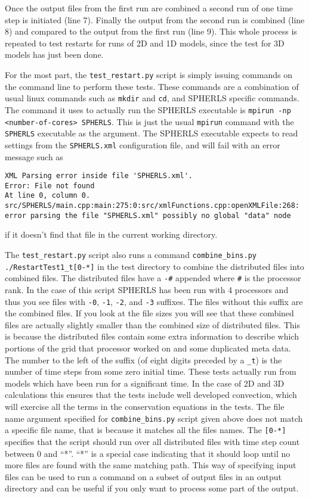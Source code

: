\documentclass[12pt,a4paper]{book}
\begin{document}
Once the output files from the first run are combined a second run of one time step is initiated (line 7). Finally the output from the second run is combined (line 8) and compared to the output from the first run (line 9). This whole process is repeated to test restarts for runs of 2D and 1D models, since the test for 3D models has just been done.

For the most part, the {\tt test\_restart.py} script is simply issuing commands on the command line to perform these tests. These commands are a combination of usual linux commands such as {\tt mkdir} and {\tt cd}, and SPHERLS specific commands. The command it uses to actually run the SPHERLS executable is {\tt mpirun -np <number-of-cores> SPHERLS}. This is just the usual {\tt mpirun} command with the {\tt SPHERLS} executable as the argument. The SPHERLS executable expects to read settings from the {\tt SPHERLS.xml} configuration file, and will fail with an error message such as 

{\tiny
\begin{verbatim}
XML Parsing error inside file 'SPHERLS.xml'.
Error: File not found
At line 0, column 0.
src/SPHERLS/main.cpp:main:275:0:src/xmlFunctions.cpp:openXMLFile:268: error parsing the file "SPHERLS.xml" possibly no global "data" node
\end{verbatim}
}
\noindent if it doesn't find that file in the current working directory.

The {\tt test\_restart.py} script also runs a command {\tt combine\_bins.py ./RestartTest1\_t[0-*]} in the test directory to combine the distributed files into combined files. The distributed files have a {\tt -\#} appended where {\tt \#} is the processor rank. In the case of this script SPHERLS has been run with 4 processors and thus you see files with {\tt -0}, {\tt -1}, {\tt -2}, and {\tt -3} suffixes. The files without this suffix are the combined files. If you look at the file sizes you will see that these combined files are actually slightly smaller than the combined size of distributed files. This is because the distributed files contain some extra information to describe which portions of the grid that processor worked on and some duplicated meta data. The number to the left of the suffix (of eight digits preceded by a {\tt \_t}) is the number of time steps from some zero initial time. These tests actually run from models which have been run for a significant time. In the case of 2D and 3D calculations this ensures that the tests include well developed convection, which will exercise all the terms in the conservation equations in the tests. The file name argument specified for {\tt combine\_bins.py} script given above does not match a specific file name, that is because it matches all the files names. The {\tt [0-*]} specifies that the script should run over all distributed files with time step count between 0 and ``*''. ``*'' is a special case indicating that it should loop until no more files are found with the same matching path. This way of specifying input files can be used to run a command on a subset of output files in an output directory and can be useful if you only want to process some part of the output.
\end{document}
